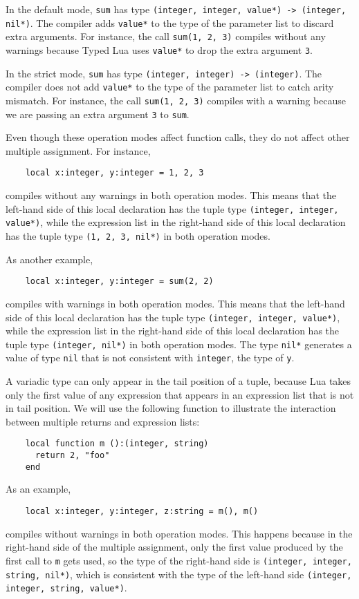 In the default mode, \texttt{sum} has type
\texttt{(integer, integer, value*) -> (integer, nil*)}.
The compiler adds \texttt{value*} to the type of the parameter list
to discard extra arguments.
For instance, the call \texttt{sum(1, 2, 3)} compiles without any
warnings because Typed Lua uses \texttt{value*} to drop the extra
argument \texttt{3}.

In the strict mode, \texttt{sum} has type
\texttt{(integer, integer) -> (integer)}.
The compiler does not add \texttt{value*} to the type of the parameter
list to catch arity mismatch.
For instance, the call \texttt{sum(1, 2, 3)} compiles with a warning
because we are passing an extra argument \texttt{3} to \texttt{sum}.

Even though these operation modes affect function calls, they do not
affect other multiple assignment.
For instance,
\begin{verbatim}
    local x:integer, y:integer = 1, 2, 3
\end{verbatim}
compiles without any warnings in both operation modes.
This means that the left-hand side of this local declaration has the
tuple type \texttt{(integer, integer, value*)}, while the expression
list in the right-hand side of this local declaration has the
tuple type \texttt{(1, 2, 3, nil*)} in both operation modes.

As another example,
\begin{verbatim}
    local x:integer, y:integer = sum(2, 2)
\end{verbatim}
compiles with warnings in both operation modes.
This means that the left-hand side of this local declaration has
the tuple type \texttt{(integer, integer, value*)}, while the
expression list in the right-hand side of this local declaration
has the tuple type \texttt{(integer, nil*)} in both operation modes.
The type \texttt{nil*} generates a value of type \texttt{nil}
that is not consistent with \texttt{integer}, the type of \texttt{y}.

A variadic type can only appear in the tail position of a tuple,
because Lua takes only the first value of any expression that appears
in an expression list that is not in tail position.
We will use the following function to illustrate the interaction
between multiple returns and expression lists:
\begin{verbatim}
    local function m ():(integer, string)
      return 2, "foo"
    end
\end{verbatim}

As an example,
\begin{verbatim}
    local x:integer, y:integer, z:string = m(), m()
\end{verbatim}
compiles without warnings in both operation modes.
This happens because in the right-hand side of the multiple
assignment, only the first value produced by the first call
to \texttt{m} gets used, so the type of the right-hand side
is \texttt{(integer, integer, string, nil*)}, which is
consistent with the type of the left-hand side
\texttt{(integer, integer, string, value*)}.


